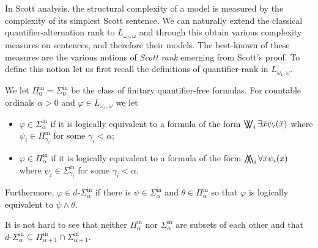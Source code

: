\documentclass[11pt]{amsart}
\newcommand{\Pinf}[1]{\Pi^{\mathrm{in}}_{#1}}
\newcommand{\Sinf}[1]{\Sigma^{\mathrm{in}}_{#1}}
\newcommand{\dSinf}[1]{d\text{-}\Sigma^{\mathrm{in}}_{#1}}
\renewcommand{\phi}{\varphi}
\newcommand{\bigwwedge}{%
	\mathop{
		\mathchoice{\bigwedge\mkern-15mu\bigwedge}
		{\bigwedge\mkern-12.5mu\bigwedge}
		{\bigwedge\mkern-12.5mu\bigwedge}
		{\bigwedge\mkern-11mu\bigwedge}
	}
}
\newcommand{\bigvvee}{%
	\mathop{
		\mathchoice{\bigvee\mkern-15mu\bigvee}
		{\bigvee\mkern-12.5mu\bigvee}
		{\bigvee\mkern-12.5mu\bigvee}
		{\bigvee\mkern-11mu\bigvee}
	}
}
\def\om{\omega}
\def\Lomom{L_{\om_1,\om}}
\theoremstyle{remark}
\begin{document}
In Scott analysis, the structural complexity of a model is measured by the complexity of its simplest Scott sentence. We can naturally extend the classical quantifier-alternation rank to $\Lomom$ and through this obtain various complexity measures on sentences, and therefore their models. The best-known of these measures are the various notions of \emph{Scott rank} emerging from Scott's proof. To define this notion let us first recall the definitions of quantifier-rank in $\Lomom$.
\begin{definition}
	We let $\Pinf{0}=\Sinf{0}$ be the class of finitary quantifier-free formulas. For countable ordinals $\alpha>0$ and $\phi\in \Lomom$ we let 
	\begin{itemize}
		\item $\phi\in \Sinf{\alpha}$ if it is logically equivalent to a formula of the form $\bigvvee_i \exists \bar x\psi_i(\bar x)$ where $\psi_i\in \Pinf{\gamma_i}$ for some $\gamma_i<\alpha$;
		\item $\phi\in \Pinf{\alpha}$ if it is logically equivalent to a formula of the form $\bigwwedge_i \forall\bar x\psi_i(\bar x)$ where $\psi_i\in \Sinf{\gamma_i}$ for some $\gamma_i<\alpha$.
	\end{itemize}
	Furthermore, $\phi\in \dSinf{\alpha}$ if there is $\psi\in \Sinf{\alpha}$ and $\theta\in \Pinf{\alpha}$ so that $\phi$ is logically equivalent to $\psi\land \theta$.
\end{definition}
It is not hard to see that neither $\Pinf{\alpha}$ nor $\Sinf{\alpha}$ are subsets of each other and that $\dSinf{\alpha}\subseteq \Pinf{\alpha+1}\cap \Sinf{\alpha+1}$.
\end{document}
